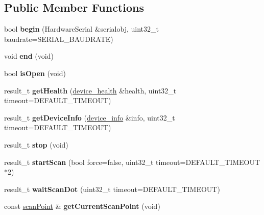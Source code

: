 \subsection*{Public Member Functions}
\begin{DoxyCompactItemize}
\item 
bool {\bfseries begin} (Hardware\+Serial \&serialobj, uint32\+\_\+t baudrate=S\+E\+R\+I\+A\+L\+\_\+\+B\+A\+U\+D\+R\+A\+TE)\hypertarget{class_y_d_lidar_a0c1a66b457d67fb465a82da15151bd02}{}\label{class_y_d_lidar_a0c1a66b457d67fb465a82da15151bd02}

\item 
void {\bfseries end} (void)\hypertarget{class_y_d_lidar_ab4f3a968e28e50745a86e3486570785f}{}\label{class_y_d_lidar_ab4f3a968e28e50745a86e3486570785f}

\item 
bool {\bfseries is\+Open} (void)\hypertarget{class_y_d_lidar_a114d6d4058d579e040ca2f5d4541bee9}{}\label{class_y_d_lidar_a114d6d4058d579e040ca2f5d4541bee9}

\item 
result\+\_\+t {\bfseries get\+Health} (\hyperlink{structdevice__health}{device\+\_\+health} \&health, uint32\+\_\+t timeout=D\+E\+F\+A\+U\+L\+T\+\_\+\+T\+I\+M\+E\+O\+UT)\hypertarget{class_y_d_lidar_aa85946476d601c558aea46ebf022dda3}{}\label{class_y_d_lidar_aa85946476d601c558aea46ebf022dda3}

\item 
result\+\_\+t {\bfseries get\+Device\+Info} (\hyperlink{structdevice__info}{device\+\_\+info} \&info, uint32\+\_\+t timeout=D\+E\+F\+A\+U\+L\+T\+\_\+\+T\+I\+M\+E\+O\+UT)\hypertarget{class_y_d_lidar_af39b9bbeb498209ef5d5a301e58815c7}{}\label{class_y_d_lidar_af39b9bbeb498209ef5d5a301e58815c7}

\item 
result\+\_\+t {\bfseries stop} (void)\hypertarget{class_y_d_lidar_a56dbcd8ca1e2b2b569f34189d69263a2}{}\label{class_y_d_lidar_a56dbcd8ca1e2b2b569f34189d69263a2}

\item 
result\+\_\+t {\bfseries start\+Scan} (bool force=false, uint32\+\_\+t timeout=D\+E\+F\+A\+U\+L\+T\+\_\+\+T\+I\+M\+E\+O\+UT $\ast$2)\hypertarget{class_y_d_lidar_ab94a06ee3862b4100a97c0d25dce88b5}{}\label{class_y_d_lidar_ab94a06ee3862b4100a97c0d25dce88b5}

\item 
result\+\_\+t {\bfseries wait\+Scan\+Dot} (uint32\+\_\+t timeout=D\+E\+F\+A\+U\+L\+T\+\_\+\+T\+I\+M\+E\+O\+UT)\hypertarget{class_y_d_lidar_ac4504ab865582884e27ba181acea6e10}{}\label{class_y_d_lidar_ac4504ab865582884e27ba181acea6e10}

\item 
const \hyperlink{structscan_point}{scan\+Point} \& {\bfseries get\+Current\+Scan\+Point} (void)\hypertarget{class_y_d_lidar_a704a5a434bb3022c9f169ab74ad90898}{}\label{class_y_d_lidar_a704a5a434bb3022c9f169ab74ad90898}

\end{DoxyCompactItemize}
